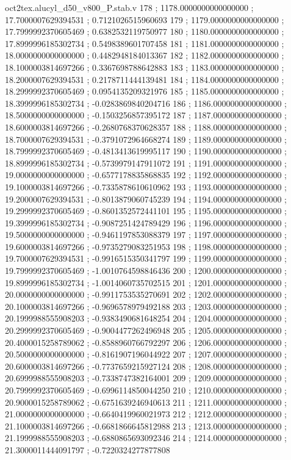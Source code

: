 \begin{filecontents}[overwrite]{oct2tex.alucyl_d50_v800_P.stab.v}
178 ; 1178.0000000000000000 ; 17.7000007629394531 ; 0.7121026515960693
179 ; 1179.0000000000000000 ; 17.7999992370605469 ; 0.6382532119750977
180 ; 1180.0000000000000000 ; 17.8999996185302734 ; 0.5498389601707458
181 ; 1181.0000000000000000 ; 18.0000000000000000 ; 0.4482948184013367
182 ; 1182.0000000000000000 ; 18.1000003814697266 ; 0.3367698788642883
183 ; 1183.0000000000000000 ; 18.2000007629394531 ; 0.2178711444139481
184 ; 1184.0000000000000000 ; 18.2999992370605469 ; 0.0954135209321976
185 ; 1185.0000000000000000 ; 18.3999996185302734 ; -0.0283869840204716
186 ; 1186.0000000000000000 ; 18.5000000000000000 ; -0.1503256857395172
187 ; 1187.0000000000000000 ; 18.6000003814697266 ; -0.2680768370628357
188 ; 1188.0000000000000000 ; 18.7000007629394531 ; -0.3791072964668274
189 ; 1189.0000000000000000 ; 18.7999992370605469 ; -0.4813413619995117
190 ; 1190.0000000000000000 ; 18.8999996185302734 ; -0.5739979147911072
191 ; 1191.0000000000000000 ; 19.0000000000000000 ; -0.6577178835868835
192 ; 1192.0000000000000000 ; 19.1000003814697266 ; -0.7335878610610962
193 ; 1193.0000000000000000 ; 19.2000007629394531 ; -0.8013879060745239
194 ; 1194.0000000000000000 ; 19.2999992370605469 ; -0.8601352572441101
195 ; 1195.0000000000000000 ; 19.3999996185302734 ; -0.9087251424789429
196 ; 1196.0000000000000000 ; 19.5000000000000000 ; -0.9461197853088379
197 ; 1197.0000000000000000 ; 19.6000003814697266 ; -0.9735279083251953
198 ; 1198.0000000000000000 ; 19.7000007629394531 ; -0.9916515350341797
199 ; 1199.0000000000000000 ; 19.7999992370605469 ; -1.0010764598846436
200 ; 1200.0000000000000000 ; 19.8999996185302734 ; -1.0014060735702515
201 ; 1201.0000000000000000 ; 20.0000000000000000 ; -0.9911753535270691
202 ; 1202.0000000000000000 ; 20.1000003814697266 ; -0.9696578979492188
203 ; 1203.0000000000000000 ; 20.1999988555908203 ; -0.9383490681648254
204 ; 1204.0000000000000000 ; 20.2999992370605469 ; -0.9004477262496948
205 ; 1205.0000000000000000 ; 20.4000015258789062 ; -0.8588960766792297
206 ; 1206.0000000000000000 ; 20.5000000000000000 ; -0.8161907196044922
207 ; 1207.0000000000000000 ; 20.6000003814697266 ; -0.7737659215927124
208 ; 1208.0000000000000000 ; 20.6999988555908203 ; -0.7338747382164001
209 ; 1209.0000000000000000 ; 20.7999992370605469 ; -0.6996114850044250
210 ; 1210.0000000000000000 ; 20.9000015258789062 ; -0.6751639246940613
211 ; 1211.0000000000000000 ; 21.0000000000000000 ; -0.6640419960021973
212 ; 1212.0000000000000000 ; 21.1000003814697266 ; -0.6681866645812988
213 ; 1213.0000000000000000 ; 21.1999988555908203 ; -0.6880865693092346
214 ; 1214.0000000000000000 ; 21.3000011444091797 ; -0.7220324277877808

\end{filecontents}
